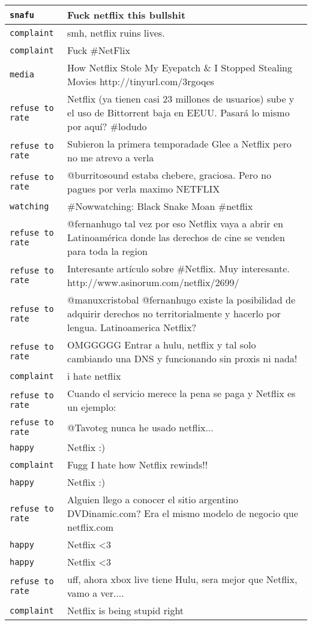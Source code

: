\begin{center}
\begin{longtable}{|l|p{120mm}|}
         \texttt{snafu} & Fuck netflix this bullshit
      \tabularnewline\hline
         \texttt{complaint} & smh, netflix ruins lives.
      \tabularnewline\hline
         \texttt{complaint} & Fuck \#NetFlix
      \tabularnewline\hline
         \texttt{media} & How Netflix Stole My Eyepatch \& I Stopped Stealing Movies http://tinyurl.com/3rgoqes
      \tabularnewline\hline
         \texttt{refuse to rate} & Netflix (ya tienen casi 23 millones de usuarios) sube y el uso de Bittorrent baja en EEUU. Pasará lo mismo por aquí? \#lodudo
      \tabularnewline\hline
         \texttt{refuse to rate} & Subieron la primera temporadade Glee a Netflix pero no me atrevo a verla
      \tabularnewline\hline
         \texttt{refuse to rate} & @burritosound estaba chebere, graciosa. Pero no pagues por verla maximo NETFLIX
      \tabularnewline\hline
         \texttt{watching} & \#Nowwatching: Black Snake Moan \#netflix
      \tabularnewline\hline
         \texttt{refuse to rate} & @fernanhugo tal vez por eso Netflix vaya a abrir en Latinoamérica donde las derechos de cine se venden para toda la region
      \tabularnewline\hline
         \texttt{refuse to rate} & Interesante artículo sobre \#Netflix. Muy interesante. http://www.asinorum.com/netflix/2699/
      \tabularnewline\hline
         \texttt{refuse to rate} & @manuxcristobal @fernanhugo existe la posibilidad de adquirir derechos no territorialmente y hacerlo por lengua. Latinoamerica Netflix?
      \tabularnewline\hline
         \texttt{refuse to rate} & OMGGGGG Entrar a hulu, netflix y tal solo cambiando una DNS y funcionando sin proxis ni nada!
      \tabularnewline\hline
         \texttt{complaint} & i hate netflix
      \tabularnewline\hline
         \texttt{refuse to rate} & Cuando el servicio merece la pena se paga y Netflix es un ejemplo:
      \tabularnewline\hline
         \texttt{refuse to rate} & @Tavoteg nunca he usado netflix...
      \tabularnewline\hline
         \texttt{happy} & Netflix :)
      \tabularnewline\hline
         \texttt{complaint} & Fugg I hate how Netflix rewinds!!
      \tabularnewline\hline
         \texttt{happy} & Netflix :)
      \tabularnewline\hline
         \texttt{refuse to rate} & Alguien llego a conocer el sitio argentino DVDinamic.com? Era el mismo modelo de negocio que netflix.com
      \tabularnewline\hline
         \texttt{happy} & Netflix <3
      \tabularnewline\hline
         \texttt{happy} & Netflix <3
      \tabularnewline\hline
         \texttt{refuse to rate} & uff, ahora xbox live tiene Hulu, sera mejor que Netflix, vamo a ver....
      \tabularnewline\hline
         \texttt{complaint} & Netflix is being stupid right

\end{longtable}
\end{center}
